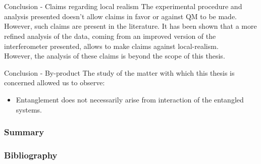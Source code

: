 \documentclass[10pt]{beamer}
\begin{document}
\section*{}
\begin{frame}{Conclusion - Claims regarding local realism}
  The experimental procedure and analysis presented doesn't allow claims in favor or against QM to be made.\\[1cm]%
  However, such claims are present in the literature. It has been shown that a more refined analysis of the data, coming from an improved version of the interferometer presented, allows to make claims against local-realism.\\
However, the analysis of these claims is beyond the scope of this thesis.
\end{frame}

\begin{frame}{Conclusion - By-product}
  The study of the matter with which this thesis is concerned allowed us to observe:
  \begin{itemize}
  \item Entanglement does not necessarily arise from interaction of the entangled systems.
  \end{itemize}
\end{frame}



\begin{frame}
  \frametitle{Summary}
  \tableofcontents
\end{frame}



\begin{frame}
  \frametitle{Bibliography}
  
  
\end{frame}
\end{document}
